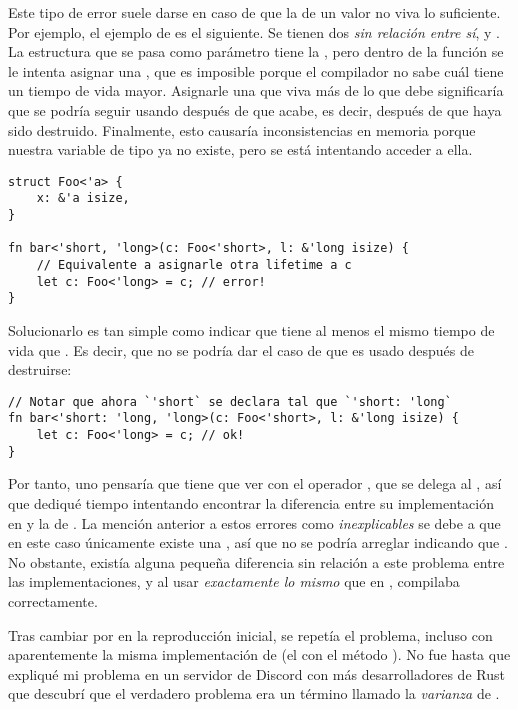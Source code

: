 Este tipo de error suele darse en caso de que la \lifetime de un valor no viva
lo suficiente. Por ejemplo, el ejemplo de  es el
siguiente. Se tienen dos \lifetimes \emph{sin relación entre sí}, 
y . La estructura  que se pasa como parámetro tiene la
\lifetime {}, pero dentro de la función se le intenta asignar una
\lifetime {}, que es imposible porque el compilador no sabe cuál tiene
un tiempo de vida mayor. Asignarle una \lifetime que viva más de lo que debe
significaría que se podría seguir usando  después de que 
acabe, es decir, después de que  haya sido destruido. Finalmente, esto
causaría inconsistencias en memoria porque nuestra variable de tipo 
ya no existe, pero se está intentando acceder a ella.

\begin{verbatim}
struct Foo<'a> {
    x: &'a isize,
}

fn bar<'short, 'long>(c: Foo<'short>, l: &'long isize) {
    // Equivalente a asignarle otra lifetime a c
    let c: Foo<'long> = c; // error!
}
\end{verbatim}

Solucionarlo es tan simple como indicar que  tiene al menos el
mismo tiempo de vida que . Es decir, que no se podría dar el caso de
que  es usado después de destruirse:

\begin{verbatim}
// Notar que ahora `'short` se declara tal que `'short: 'long`
fn bar<'short: 'long, 'long>(c: Foo<'short>, l: &'long isize) {
    let c: Foo<'long> = c; // ok!
}
\end{verbatim}

Por tanto, uno pensaría que tiene que ver con el operador \rust{==}, que se
delega al \trait {}, así que dediqué tiempo intentando encontrar
la diferencia entre su implementación en  y la de
. La mención anterior a estos errores como
\emph{inexplicables} se debe a que en este caso únicamente existe una \lifetime
{}, así que no se podría arreglar indicando que . No
obstante, existía alguna pequeña diferencia sin relación a este problema entre
las implementaciones, y al usar \emph{exactamente lo mismo} que en , compilaba correctamente.

Tras cambiar  por  en la reproducción
inicial, se repetía el problema, incluso con aparentemente la misma
implementación de  (el \trait con el método ). No fue hasta
que expliqué mi problema en un servidor de Discord con más desarrolladores de
Rust que descubrí que el verdadero problema era un término llamado la
\emph{varianza} de .


